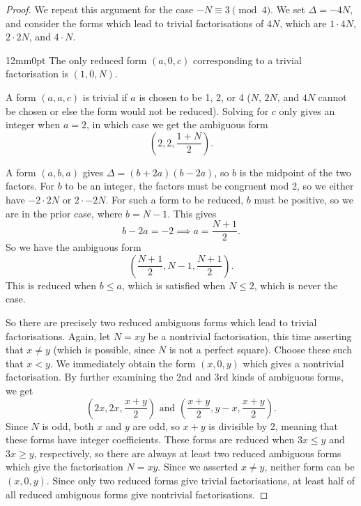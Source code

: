 \documentclass[honours,12pt]{unswthesis}
\numberwithin{equation}{section}
\begin{document}
\begin{proof}
    We repeat this argument for the case $-N \equiv 3 \pmod{4}$.
    We set $\Delta = -4N$, and consider the forms which lead to trivial factorisations of $4N$, which are $1 \cdot 4N$, $2 \cdot 2N$, and $4 \cdot N$.
    \begin{adjustwidth}{12mm}{0pt}
        \vspace{5mm}
        \noindent
         \hspace{-3mm}
        The only reduced form $(a, 0, c)$ corresponding to a trivial factorisation is $(1, 0, N)$.

        \vspace{5mm}
        \noindent
         \hspace{-3mm}
        A form $(a, a, c)$ is trivial if $a$ is chosen to be 1, 2, or 4 ($N$, $2N$, and $4N$ cannot be chosen or else the form would not be reduced).
        Solving for $c$ only gives an integer when $a = 2$, in which case we get the ambiguous form
        $$\left(2, 2, \frac{1 + N}{2} \right).$$

        \vspace{5mm}
        \noindent
         \hspace{-3mm}
        A form $(a, b, a)$ gives $\Delta = (b + 2a)(b - 2a)$, so $b$ is the midpoint of the two factors.
        For $b$ to be an integer, the factors must be congruent mod 2, so we either have $-2 \cdot 2N$ or $2 \cdot -2N$.
        For such a form to be reduced, $b$ must be positive, so we are in the prior case, where $b = N - 1$.
        This gives 
        $$b - 2a = -2 \implies a = \frac{N + 1}{2}.$$
        So we have the ambiguous form
        $$\left( \frac{N + 1}{2}, N - 1, \frac{N + 1}{2} \right).$$
        This is reduced when $b \leq a$, which is satisfied when $N \leq 2$, which is never the case.
    \end{adjustwidth}
    \vspace{2mm}
    So there are precisely two reduced ambiguous forms which lead to trivial factorisations.
    Again, let $N = xy$ be a nontrivial factorisation, this time asserting that $x \neq y$ (which is possible, since $N$ is not a perfect square).
    Choose these such that $x < y$. 
    We immediately obtain the form $(x, 0, y)$ which gives a nontrivial factorisation.
    By further examining the 2nd and 3rd kinds of ambiguous forms, we get
    $$\left( 2x, 2x, \frac{x + y}{2} \right) \text{ and } \left( \frac{x + y}{2}, y - x, \frac{x + y}{2} \right).$$
    Since $N$ is odd, both $x$ and $y$ are odd, so $x + y$ is divisible by 2, meaning that these forms have integer coefficients.
    These forms are reduced when $3x \leq y$ and $3x \geq y$, respectively, so there are always at least two reduced ambiguous forms which give the factorisation $N = xy$.
    Since we asserted $x \neq y$, neither form can be $(x, 0, y)$.
    Since only two reduced forms give trivial factorisations, at least half of all reduced ambiguous forms give nontrivial factorisations.
\end{proof}
\end{document}
